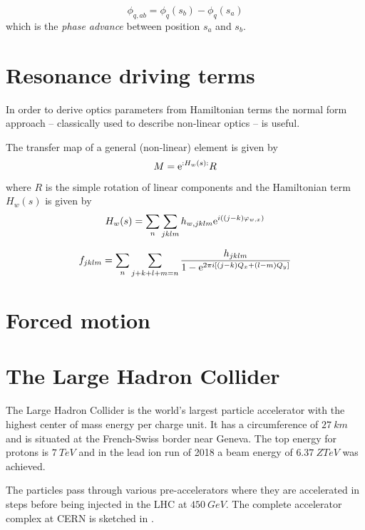 \begin{equation}
    \phi_{q,ab} = \phi_q(s_b) - \phi_q(s_a)
\end{equation}
which is the \emph{phase advance} between position $s_a$ and $s_b$.


\section{Resonance driving terms}

In order to derive optics parameters from Hamiltonian terms the normal form approach -- classically
used to describe non-linear optics -- is useful. 

The transfer map of a general (non-linear) element is given by
\begin{equation}
    M= \text{e}^{:H_w(s):}R
\end{equation}
where $R$ is the simple rotation of linear components and the Hamiltonian term $H_w(s)$ is given by
\begin{equation}
    H_w(s) = \sum\limits_n\sum\limits_{jklm} h_{w,jklm}\text{e}^{i\left((j-k)\varphi_{w,x}\right)}
\end{equation}

\begin{equation}
    f_{jklm}=\sum\limits_{n}\sum\limits_{j+k+l+m=n} \frac{h_{jklm} }{1-\text{e}^{2\pi i [(j-k)Q_x+(l-m)Q_y]}}
\end{equation}


\section{Forced motion}

\section{The Large Hadron Collider}

The Large Hadron Collider is the world's largest particle accelerator with the highest center of mass
energy per charge unit. It has a circumference of $\SI{27}{km}$ and is situated at the French-Swiss 
border near Geneva. The top energy for protons is $\SI{7}{TeV}$
and in the lead ion run of 2018 a beam energy of $\SI{6.37}{Z TeV}$ was achieved.

The particles pass through various pre-accelerators where they are accelerated in steps before being
injected in the LHC at $\SI{450}{GeV}$. The complete accelerator complex at CERN is sketched in
.

